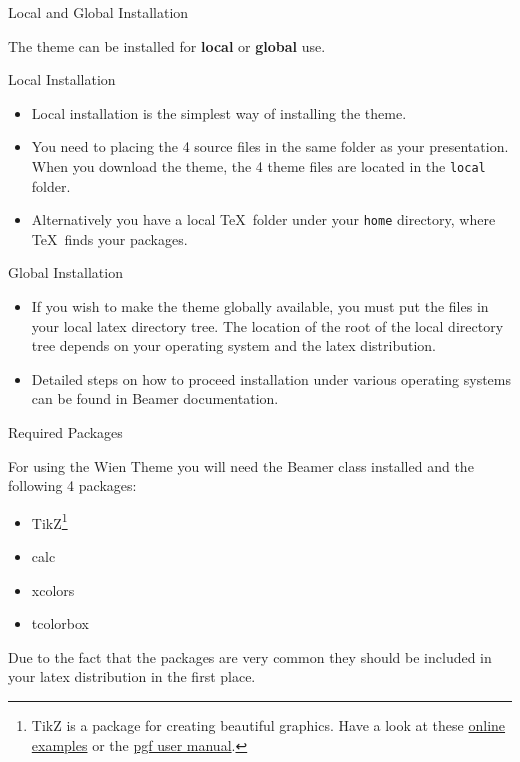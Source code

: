 \documentclass[aspectratio=169]{beamer}
\begin{document}
\begin{frame}{Local and Global Installation}
  
  The theme can be installed for \textbf{local} or \textbf{global} use.
  \begin{block}{Local Installation}
  \begin{itemize}    
    \item Local installation is the simplest way of installing the theme. 
    \item You need to placing the 4 source files in the same folder as
      your presentation. When you download the theme, the 4 theme
      files are located in the {\tt local} folder.
    \item Alternatively you have a local \TeX\  folder under your \texttt{home}
      directory, where \TeX\  finds your packages.
  \end{itemize}
  \end{block}

  \begin{block}{Global Installation}
  \begin{itemize}
     \item If you wish to make the theme globally available, you must
       put the files in your local latex directory tree. The location
       of the root of the local directory tree depends on your
       operating system and the latex distribution.
     \item Detailed steps on how to proceed installation under various
       operating systems can be found in Beamer documentation.
  \end{itemize}
  \end{block}
\end{frame}

\begin{frame}{Required Packages}
  \begin{block}{}
    For using the Wien Theme you will need the Beamer class installed
    and the following 4 packages:
    \begin{itemize}
    \item TikZ\footnote{TikZ is a package for creating beautiful
        graphics. Have a look at these
        \href{http://www.texample.net/tikz/examples/}{online examples}
        or the
        \href{http://tug.ctan.org/tex-archive/graphics/pgf/base/doc/generic/pgf/pgfmanual.pdf}{pgf
          user manual}.}
    \item calc
    \item xcolors
    \item tcolorbox
    \end{itemize}
    Due to the fact that the packages are very common they should be
    included in your latex distribution in the first place.
  \end{block}
  \end{frame}
\end{document}
